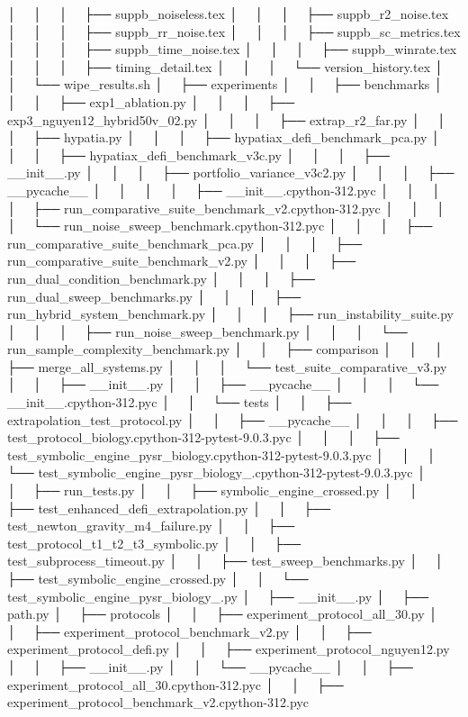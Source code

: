 │   │       │   ├── suppb_noiseless.tex
│   │       │   ├── suppb_r2_noise.tex
│   │       │   ├── suppb_rr_noise.tex
│   │       │   ├── suppb_sc_metrics.tex
│   │       │   ├── suppb_time_noise.tex
│   │       │   ├── suppb_winrate.tex
│   │       │   ├── timing_detail.tex
│   │       │   └── version_history.tex
│   │       └── wipe_results.sh
│   ├── experiments
│   │   ├── benchmarks
│   │   │   ├── exp1_ablation.py
│   │   │   ├── exp3_nguyen12_hybrid50v_02.py
│   │   │   ├── extrap_r2_far.py
│   │   │   ├── hypatia.py
│   │   │   ├── hypatiax_defi_benchmark_pca.py
│   │   │   ├── hypatiax_defi_benchmark_v3c.py
│   │   │   ├── __init__.py
│   │   │   ├── portfolio_variance_v3c2.py
│   │   │   ├── __pycache__
│   │   │   │   ├── __init__.cpython-312.pyc
│   │   │   │   ├── run_comparative_suite_benchmark_v2.cpython-312.pyc
│   │   │   │   └── run_noise_sweep_benchmark.cpython-312.pyc
│   │   │   ├── run_comparative_suite_benchmark_pca.py
│   │   │   ├── run_comparative_suite_benchmark_v2.py
│   │   │   ├── run_dual_condition_benchmark.py
│   │   │   ├── run_dual_sweep_benchmarks.py
│   │   │   ├── run_hybrid_system_benchmark.py
│   │   │   ├── run_instability_suite.py
│   │   │   ├── run_noise_sweep_benchmark.py
│   │   │   └── run_sample_complexity_benchmark.py
│   │   ├── comparison
│   │   │   ├── merge_all_systems.py
│   │   │   └── test_suite_comparative_v3.py
│   │   ├── __init__.py
│   │   ├── __pycache__
│   │   │   └── __init__.cpython-312.pyc
│   │   └── tests
│   │       ├── extrapolation_test_protocol.py
│   │       ├── __pycache__
│   │       │   ├── test_protocol_biology.cpython-312-pytest-9.0.3.pyc
│   │       │   ├── test_symbolic_engine_pysr_biology.cpython-312-pytest-9.0.3.pyc
│   │       │   └── test_symbolic_engine_pysr_biology_.cpython-312-pytest-9.0.3.pyc
│   │       ├── run_tests.py
│   │       ├── symbolic_engine_crossed.py
│   │       ├── test_enhanced_defi_extrapolation.py
│   │       ├── test_newton_gravity_m4_failure.py
│   │       ├── test_protocol_t1_t2_t3_symbolic.py
│   │       ├── test_subprocess_timeout.py
│   │       ├── test_sweep_benchmarks.py
│   │       ├── test_symbolic_engine_crossed.py
│   │       └── test_symbolic_engine_pysr_biology_.py
│   ├── __init__.py
│   ├── path.py
│   ├── protocols
│   │   ├── experiment_protocol_all_30.py
│   │   ├── experiment_protocol_benchmark_v2.py
│   │   ├── experiment_protocol_defi.py
│   │   ├── experiment_protocol_nguyen12.py
│   │   ├── __init__.py
│   │   └── __pycache__
│   │       ├── experiment_protocol_all_30.cpython-312.pyc
│   │       ├── experiment_protocol_benchmark_v2.cpython-312.pyc

